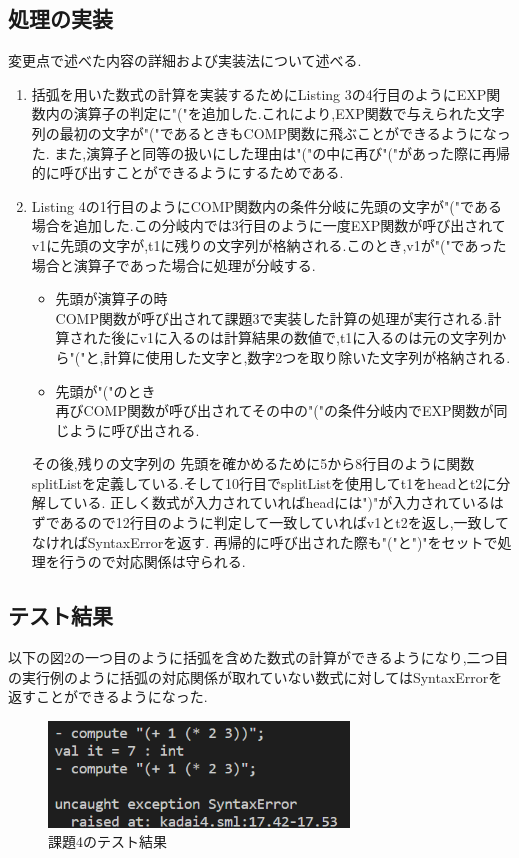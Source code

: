 \documentclass[dvipdfmx]{jarticle}
\begin{document}
\subsection{処理の実装}
変更点で述べた内容の詳細および実装法について述べる.
\begin{enumerate}
    \item 括弧を用いた数式の計算を実装するためにListing 3の4行目のようにEXP関数内の演算子の判定に"("を追加した.これにより,EXP関数で与えられた文字列の最初の文字が"("であるときもCOMP関数に飛ぶことができるようになった.
    また,演算子と同等の扱いにした理由は"("の中に再び"("があった際に再帰的に呼び出すことができるようにするためである.
    \item Listing 4の1行目のようにCOMP関数内の条件分岐に先頭の文字が"("である場合を追加した.この分岐内では3行目のように一度EXP関数が呼び出されてv1に先頭の文字が,t1に残りの文字列が格納される.このとき,v1が"("であった場合と演算子であった場合に処理が分岐する.
    \begin{itemize}
        \item 先頭が演算子の時\mbox{}\\
        COMP関数が呼び出されて課題3で実装した計算の処理が実行される.計算された後にv1に入るのは計算結果の数値で,t1に入るのは元の文字列から"("と,計算に使用した文字と,数字2つを取り除いた文字列が格納される.
        \item 先頭が"("のとき\mbox{}\\
        再びCOMP関数が呼び出されてその中の"("の条件分岐内でEXP関数が同じように呼び出される.
    \end{itemize}
    その後,残りの文字列の
    先頭を確かめるために5から8行目のように関数splitListを定義している.そして10行目でsplitListを使用してt1をheadとt2に分解している.
    正しく数式が入力されていればheadには")"が入力されているはずであるので12行目のように判定して一致していればv1とt2を返し,一致してなければSyntaxErrorを返す.
    再帰的に呼び出された際も"("と")"をセットで処理を行うので対応関係は守られる.
\end{enumerate}

\subsection{テスト結果}
以下の図2の一つ目のように括弧を含めた数式の計算ができるようになり,二つ目の実行例のように括弧の対応関係が取れていない数式に対してはSyntaxErrorを返すことができるようになった.
\begin{figure}[h]
    \centering
    \includegraphics[width=8cm]{test3.png}
    \caption{課題4のテスト結果}
\end{figure}
\end{document}
